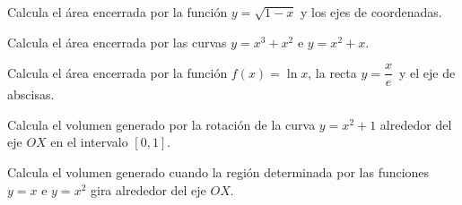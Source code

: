 \begin{ejemplo}{
    Calcula el área encerrada por la función $y=\sqrt{1-x}$ y los ejes de coordenadas.
}
\end{ejemplo}

\begin{ejemplo}{
    Calcula el área encerrada por las curvas $y=x^3+x^2$ e $y=x^2+x$.
}
\end{ejemplo}

\begin{ejemplo}{
    Calcula el área encerrada por la función $f(x)=\ln{x}$, la recta $y=\dfrac{x}e\,$ y el eje de abscisas.
}
\end{ejemplo}

\begin{ejemplo}{
    Calcula el volumen generado por la rotación de la curva $y=x^2+1$ alrededor del eje $OX$ en el intervalo $[0,1]$.
}
\end{ejemplo}

\begin{ejemplo}{
    Calcula el volumen generado cuando la región determinada por las funciones $y=x$ e $y=x^2$ gira alrededor del eje $OX$.
}
\end{ejemplo}

